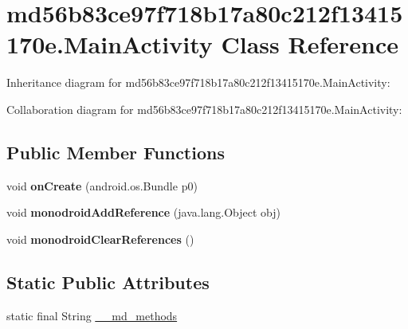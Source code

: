 \hypertarget{classmd56b83ce97f718b17a80c212f13415170e_1_1_main_activity}{}\section{md56b83ce97f718b17a80c212f13415170e.\+Main\+Activity Class Reference}
\label{classmd56b83ce97f718b17a80c212f13415170e_1_1_main_activity}


Inheritance diagram for md56b83ce97f718b17a80c212f13415170e.\+Main\+Activity\+:


Collaboration diagram for md56b83ce97f718b17a80c212f13415170e.\+Main\+Activity\+:
\subsection*{Public Member Functions}
\begin{DoxyCompactItemize}
\item 
\mbox{\label{classmd56b83ce97f718b17a80c212f13415170e_1_1_main_activity_afc49a58714965b4b6ce6db6b0b0e3402}} 
void {\bfseries on\+Create} (android.\+os.\+Bundle p0)
\item 
\mbox{\label{classmd56b83ce97f718b17a80c212f13415170e_1_1_main_activity_ae8a610b3dfbf5a4b774a53d35364a2e2}} 
void {\bfseries monodroid\+Add\+Reference} (java.\+lang.\+Object obj)
\item 
\mbox{\label{classmd56b83ce97f718b17a80c212f13415170e_1_1_main_activity_acab4d07081481afa8bf9572a49d50a76}} 
void {\bfseries monodroid\+Clear\+References} ()
\end{DoxyCompactItemize}
\subsection*{Static Public Attributes}
\begin{DoxyCompactItemize}
\item 
static final String \hyperlink{classmd56b83ce97f718b17a80c212f13415170e_1_1_main_activity_aa8091dd55d89e19cbee0112093629ec0}{\+\_\+\+\_\+md\+\_\+methods}
\end{DoxyCompactItemize}


